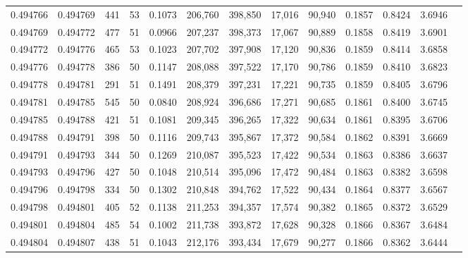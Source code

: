 \begin{tabular}{rrrrrrrrrrrrr}
0.494766 & 0.494769 &   441 &  53 &                                     0.1073 & 206,760 & 398,850 &  17,016 &  90,940 & 0.1857 & 0.8424 & 3.6946 \\
0.494769 & 0.494772 &   477 &  51 &                                     0.0966 & 207,237 & 398,373 &  17,067 &  90,889 & 0.1858 & 0.8419 & 3.6901 \\
0.494772 & 0.494776 &   465 &  53 &                                     0.1023 & 207,702 & 397,908 &  17,120 &  90,836 & 0.1859 & 0.8414 & 3.6858 \\
0.494776 & 0.494778 &   386 &  50 &                                     0.1147 & 208,088 & 397,522 &  17,170 &  90,786 & 0.1859 & 0.8410 & 3.6823 \\
0.494778 & 0.494781 &   291 &  51 &                                     0.1491 & 208,379 & 397,231 &  17,221 &  90,735 & 0.1859 & 0.8405 & 3.6796 \\
0.494781 & 0.494785 &   545 &  50 &                                     0.0840 & 208,924 & 396,686 &  17,271 &  90,685 & 0.1861 & 0.8400 & 3.6745 \\
0.494785 & 0.494788 &   421 &  51 &                                     0.1081 & 209,345 & 396,265 &  17,322 &  90,634 & 0.1861 & 0.8395 & 3.6706 \\
0.494788 & 0.494791 &   398 &  50 &                                     0.1116 & 209,743 & 395,867 &  17,372 &  90,584 & 0.1862 & 0.8391 & 3.6669 \\
0.494791 & 0.494793 &   344 &  50 &                                     0.1269 & 210,087 & 395,523 &  17,422 &  90,534 & 0.1863 & 0.8386 & 3.6637 \\
0.494793 & 0.494796 &   427 &  50 &                                     0.1048 & 210,514 & 395,096 &  17,472 &  90,484 & 0.1863 & 0.8382 & 3.6598 \\
0.494796 & 0.494798 &   334 &  50 &                                     0.1302 & 210,848 & 394,762 &  17,522 &  90,434 & 0.1864 & 0.8377 & 3.6567 \\
0.494798 & 0.494801 &   405 &  52 &                                     0.1138 & 211,253 & 394,357 &  17,574 &  90,382 & 0.1865 & 0.8372 & 3.6529 \\
0.494801 & 0.494804 &   485 &  54 &                                     0.1002 & 211,738 & 393,872 &  17,628 &  90,328 & 0.1866 & 0.8367 & 3.6484 \\
0.494804 & 0.494807 &   438 &  51 &                                     0.1043 & 212,176 & 393,434 &  17,679 &  90,277 & 0.1866 & 0.8362 & 3.6444 \\

\end{tabular}
